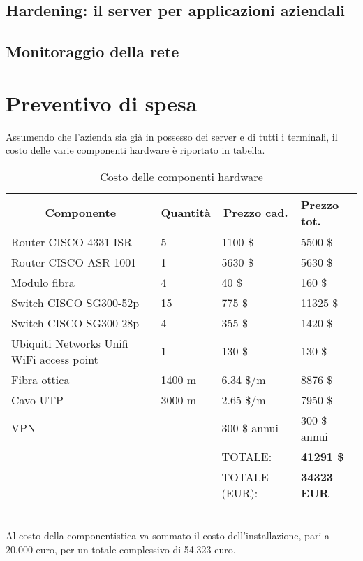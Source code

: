 \documentclass[a4paper,11pt]{article}
\begin{document}
\subsection{Hardening: il server per applicazioni aziendali}

\subsection{Monitoraggio della rete}
\newpage
\section{Preventivo di spesa}
Assumendo che l'azienda sia già in possesso dei server e di tutti i terminali, il costo delle varie componenti hardware è riportato in tabella.
\begin{table}[H]
\centering
\label{costo componentistica}
\begin{tabular}{ll|l|l|}
\hline
\multicolumn{1}{|c|}{\textbf{Componente}} & \multicolumn{1}{c|}{\textbf{Quantità}} & \multicolumn{1}{c|}{\textbf{Prezzo cad.}} & \textbf{Prezzo tot.} \\ \hline
\multicolumn{1}{|l|}{Router CISCO 4331 ISR} & 5 & 1100 \$ & 5500 \$ \\ \hline
\multicolumn{1}{|l|}{Router CISCO ASR 1001} & 1 & 5630 \$ & 5630 \$ \\ \hline
\multicolumn{1}{|l|}{Modulo fibra} & 4 & 40 \$ & 160 \$ \\ \hline
\multicolumn{1}{|l|}{Switch CISCO SG300-52p} & 15 & 775 \$ & 11325 \$ \\ \hline
\multicolumn{1}{|l|}{Switch CISCO SG300-28p} & 4 & 355 \$ & 1420 \$ \\ \hline
\multicolumn{1}{|l|}{Ubiquiti Networks Unifi WiFi access point} & 1 & 130 \$ & 130 \$ \\ \hline
\multicolumn{1}{|l|}{Fibra ottica} & 1400 m & 6.34 \$/m & 8876 \$ \\ \hline
\multicolumn{1}{|l|}{Cavo UTP} & 3000 m & 2.65 \$/m & 7950 \$ \\ \hline
\multicolumn{1}{|l|}{VPN} &  & 300 \$ annui & 300 \$ annui \\ \hline
 &  & TOTALE: & \textbf{41291 \$} \\ \cline{3-4} 
 &  & TOTALE (EUR): & \textbf{34323 EUR} \\ \cline{3-4} 
\end{tabular}
\caption{Costo delle componenti hardware}
\end{table}
\ \\Al costo della componentistica va sommato il costo dell'installazione, pari a 20.000 euro, per un totale complessivo di 54.323 euro.
\end{document}
